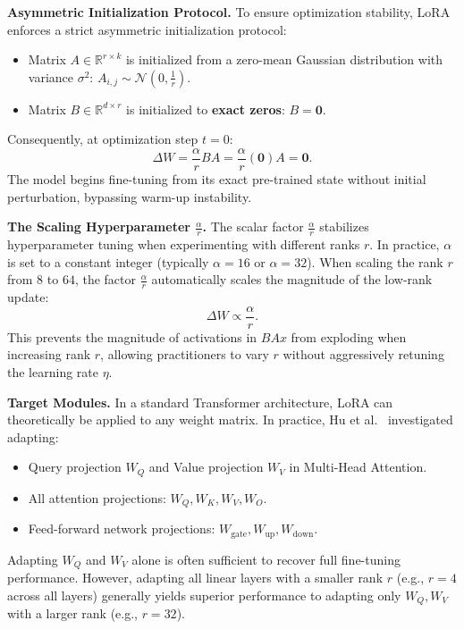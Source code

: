 \documentclass[../../../main.tex]{subfiles}
\begin{document}
\noindent\textbf{Asymmetric Initialization Protocol.}
To ensure optimization stability, LoRA enforces a strict asymmetric initialization protocol:
\begin{itemize}
    \item Matrix $A \in \mathbb{R}^{r \times k}$ is initialized from a zero-mean Gaussian distribution with variance $\sigma^2$: $A_{i,j} \sim \mathcal{N}\left(0, \frac{1}{r}\right)$.
    \item Matrix $B \in \mathbb{R}^{d \times r}$ is initialized to \textbf{exact zeros}: $B = \mathbf{0}$.
\end{itemize}
Consequently, at optimization step $t = 0$:
\begin{equation}
\Delta W = \frac{\alpha}{r} B A = \frac{\alpha}{r} (\mathbf{0}) A = \mathbf{0}.
\end{equation}
The model begins fine-tuning from its exact pre-trained state without initial perturbation, bypassing warm-up instability.

\noindent\textbf{The Scaling Hyperparameter $\frac{\alpha}{r}$.}
The scalar factor $\frac{\alpha}{r}$ stabilizes hyperparameter tuning when experimenting with different ranks $r$. In practice, $\alpha$ is set to a constant integer (typically $\alpha = 16$ or $\alpha = 32$). When scaling the rank $r$ from $8$ to $64$, the factor $\frac{\alpha}{r}$ automatically scales the magnitude of the low-rank update:
\begin{equation}
\Delta W \propto \frac{\alpha}{r}.
\end{equation}
This prevents the magnitude of activations in $B A x$ from exploding when increasing rank $r$, allowing practitioners to vary $r$ without aggressively retuning the learning rate $\eta$.

\noindent\textbf{Target Modules.}
In a standard Transformer architecture, LoRA can theoretically be applied to any weight matrix. In practice, Hu et al.~\citep{hu2021lora} investigated adapting:
\begin{itemize}
    \item Query projection $W_Q$ and Value projection $W_V$ in Multi-Head Attention.
    \item All attention projections: $W_Q, W_K, W_V, W_O$.
    \item Feed-forward network projections: $W_{\text{gate}}, W_{\text{up}}, W_{\text{down}}$.
\end{itemize}
Adapting $W_Q$ and $W_V$ alone is often sufficient to recover full fine-tuning performance. However, adapting all linear layers with a smaller rank $r$ (e.g., $r=4$ across all layers) generally yields superior performance to adapting only $W_Q, W_V$ with a larger rank (e.g., $r=32$).
\end{document}
